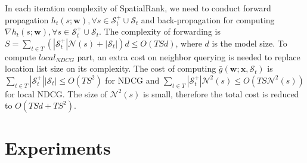 \documentclass{article}
\def \S {\mathbf{S}}
\def \w {\mathbf{w}}
\def \x {\mathbf{x}}
\def \x {\mathbf{x}}
\def \x {\mathbf{x}}
\def \w {\mathbf{w}}
\def \S {\mathcal{S}}
\def \N {\mathcal{N}}
\begin{document}
In each iteration complexity of SpatialRank, we need to conduct forward propagation $h_t(s; \w), \forall s \in \S_t^+ \cup \S_t$ and back-propagation for computing $\nabla h_t(s; \w), \forall s \in \S_t^+ \cup \S_t$. The complexity of forwarding is $S = \sum_{t \in T} (|\S_t^+|\N{(s)} + |\S_t|)d \leq O(TSd)$, where $d$ is the model size. To compute $local_{NDCG}$ part, an extra cost on neighbor querying is needed to replace location list size on its complexity. The cost of computing $\bar g(\w; \x, \S_t)$ is $\sum_{t \in T} |\S_t^+||\S_t| \leq O(TS^2)$ for NDCG and $\sum_{t \in T} |\S_t^+| \N^2{(s)} \leq O(TS\N^2{(s)})$ for local NDCG. The size of $\N^2{(s)}$ is small, 
therefore the total cost is reduced to $O(TSd + TS^2)$. %


\section{Experiments}
\end{document}
